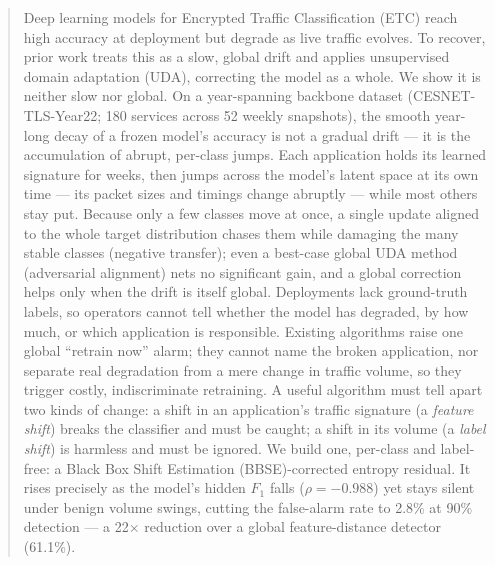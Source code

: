 \begin{abstract}
Deep learning models for Encrypted Traffic Classification (ETC) reach high accuracy at deployment but degrade as live traffic evolves. To recover, prior work treats this as a slow, global drift and applies unsupervised domain adaptation (UDA), correcting the model as a whole. We show it is neither slow nor global. On a year-spanning backbone dataset (CESNET-TLS-Year22; 180 services across 52 weekly snapshots), the smooth year-long decay of a frozen model's accuracy is not a gradual drift --- it is the accumulation of abrupt, per-class jumps. Each application holds its learned signature for weeks, then jumps across the model's latent space at its own time --- its packet sizes and timings change abruptly --- while most others stay put. Because only a few classes move at once, a single update aligned to the whole target distribution chases them while damaging the many stable classes (negative transfer); even a best-case global UDA method (adversarial alignment) nets no significant gain, and a global correction helps only when the drift is itself global.
Deployments lack ground-truth labels, so operators cannot tell whether the model has degraded, by how much, or which application is responsible. Existing algorithms raise one global ``retrain now'' alarm; they cannot name the broken application, nor separate real degradation from a mere change in traffic volume, so they trigger costly, indiscriminate retraining. A useful algorithm must tell apart two kinds of change: a shift in an application's traffic signature (a \emph{feature shift}) breaks the classifier and must be caught; a shift in its volume (a \emph{label shift}) is harmless and must be ignored. We build one, per-class and label-free: a Black Box Shift Estimation (BBSE)-corrected entropy residual. It rises precisely as the model's hidden $F_1$ falls ($\rho = -0.988$) yet stays silent under benign volume swings, cutting the false-alarm rate to 2.8\% at 90\% detection --- a 22$\times$ reduction over a global feature-distance detector (61.1\%).

\end{abstract}
